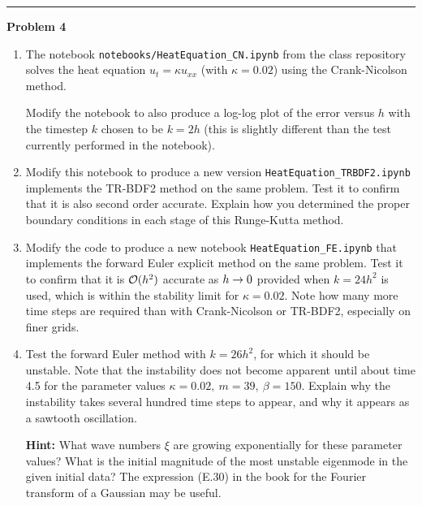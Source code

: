 \documentclass[10pt]{article}
\begin{document}



\vskip 1cm
\hrule
{\bf Problem 4}  


\begin{enumerate} 
\item The notebook \verb+notebooks/HeatEquation_CN.ipynb+ from the
class repository solves the heat equation $u_t = \kappa u_{xx}$
(with $\kappa = 0.02$) using the Crank-Nicolson method.

Modify the notebook to also 
produce a log-log plot of the error versus $h$ with the timestep $k$ chosen
to be $k=2h$ (this is slightly different than the test currently performed in
the notebook).

\item Modify this notebook to produce a new version
\verb+HeatEquation_TRBDF2.ipynb+
implements the TR-BDF2 method on the same problem.  Test it to confirm that
it is also second order accurate.  Explain how you determined the proper
boundary conditions in each stage of this Runge-Kutta method.

\item Modify the code to produce a new notebook \verb+HeatEquation_FE.ipynb+
that implements the forward Euler explicit method on the same
problem.  Test it to confirm that it is ${\mathcal O}(h^2)$ accurate as
$h\rightarrow 0$ provided when $k = 24 h^2$ is used, which is within the
stability limit for $\kappa = 0.02$.  Note how many more time steps
are required than with Crank-Nicolson or TR-BDF2, especially on
finer grids.

\item Test the forward Euler method with $k = 26 h^2$, for which it should be
unstable.  Note that the instability does not become apparent until about
time 4.5 for the parameter values $\kappa = 0.02,~ m=39,~\beta = 150$.
Explain why the instability takes several hundred time steps to appear, and
why it appears as a sawtooth oscillation. 

{\bf Hint:} What wave numbers $\xi$ are growing exponentially for these
parameter values?  What is the initial magnitude of the most unstable
eigenmode in the given initial data?  The expression (E.30) in the book
for the Fourier transform of a Gaussian may be useful.

\end{enumerate}






\end{document}
